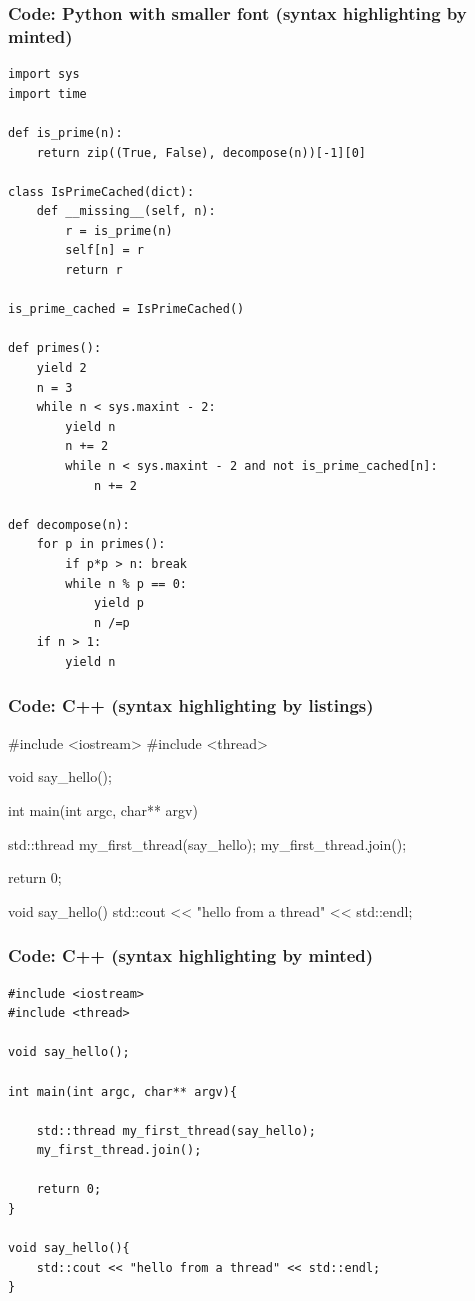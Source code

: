 \begin{frame}[fragile]
\frametitle{Code: Python with smaller font (syntax highlighting by minted)}
\begin{verbatim}
import sys
import time
 
def is_prime(n):
    return zip((True, False), decompose(n))[-1][0]
 
class IsPrimeCached(dict):
    def __missing__(self, n):
        r = is_prime(n)
        self[n] = r
        return r
 
is_prime_cached = IsPrimeCached()
 
def primes():
    yield 2
    n = 3
    while n < sys.maxint - 2:
        yield n
        n += 2
        while n < sys.maxint - 2 and not is_prime_cached[n]:
            n += 2
 
def decompose(n):
    for p in primes():
        if p*p > n: break
        while n % p == 0:
            yield p
            n /=p
    if n > 1:
        yield n
\end{verbatim}
\end{frame}

\begin{frame}[fragile]
\frametitle{Code: C++ (syntax highlighting by listings)}
\begin{cpp}
#include <iostream>
#include <thread>

void say_hello();

int main(int argc, char** argv){

    std::thread my_first_thread(say_hello);
    my_first_thread.join();

    return 0;
}

void say_hello(){
    std::cout << "hello from a thread" << std::endl;
}
\end{cpp}
\end{frame}

\begin{frame}[fragile]
\frametitle{Code: C++ (syntax highlighting by minted)}
\begin{verbatim}
#include <iostream>
#include <thread>

void say_hello();

int main(int argc, char** argv){

    std::thread my_first_thread(say_hello);
    my_first_thread.join();

    return 0;
}

void say_hello(){
    std::cout << "hello from a thread" << std::endl;
}
\end{verbatim}
\end{frame}

